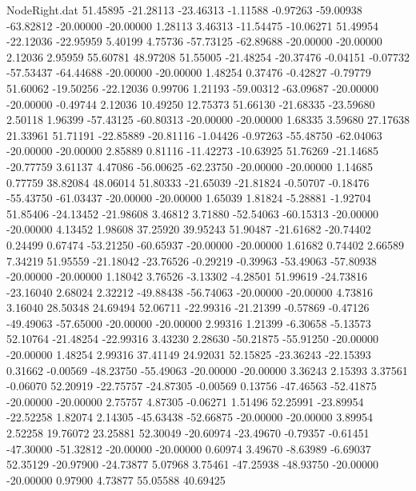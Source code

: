 \begin{filecontents}{NodeRight.dat}
  51.45895  -21.28113  -23.46313    -1.11588   -0.97263  -59.00938  -63.82812  -20.00000  -20.00000    1.28113    3.46313  -11.54475  -10.06271
  51.49954  -22.12036  -22.95959     5.40199    4.75736  -57.73125  -62.89688  -20.00000  -20.00000    2.12036    2.95959   55.60781   48.97208
  51.55005  -21.48254  -20.37476    -0.04151   -0.07732  -57.53437  -64.44688  -20.00000  -20.00000    1.48254    0.37476   -0.42827   -0.79779
  51.60062  -19.50256  -22.12036     0.99706    1.21193  -59.00312  -63.09687  -20.00000  -20.00000   -0.49744    2.12036   10.49250   12.75373
  51.66130  -21.68335  -23.59680     2.50118    1.96399  -57.43125  -60.80313  -20.00000  -20.00000    1.68335    3.59680   27.17638   21.33961
  51.71191  -22.85889  -20.81116    -1.04426   -0.97263  -55.48750  -62.04063  -20.00000  -20.00000    2.85889    0.81116  -11.42273  -10.63925
  51.76269  -21.14685  -20.77759     3.61137    4.47086  -56.00625  -62.23750  -20.00000  -20.00000    1.14685    0.77759   38.82084   48.06014
  51.80333  -21.65039  -21.81824    -0.50707   -0.18476  -55.43750  -61.03437  -20.00000  -20.00000    1.65039    1.81824   -5.28881   -1.92704
  51.85406  -24.13452  -21.98608     3.46812    3.71880  -52.54063  -60.15313  -20.00000  -20.00000    4.13452    1.98608   37.25920   39.95243
  51.90487  -21.61682  -20.74402     0.24499    0.67474  -53.21250  -60.65937  -20.00000  -20.00000    1.61682    0.74402    2.66589    7.34219
  51.95559  -21.18042  -23.76526    -0.29219   -0.39963  -53.49063  -57.80938  -20.00000  -20.00000    1.18042    3.76526   -3.13302   -4.28501
  51.99619  -24.73816  -23.16040     2.68024    2.32212  -49.88438  -56.74063  -20.00000  -20.00000    4.73816    3.16040   28.50348   24.69494
  52.06711  -22.99316  -21.21399    -0.57869   -0.47126  -49.49063  -57.65000  -20.00000  -20.00000    2.99316    1.21399   -6.30658   -5.13573
  52.10764  -21.48254  -22.99316     3.43230    2.28630  -50.21875  -55.91250  -20.00000  -20.00000    1.48254    2.99316   37.41149   24.92031
  52.15825  -23.36243  -22.15393     0.31662   -0.00569  -48.23750  -55.49063  -20.00000  -20.00000    3.36243    2.15393    3.37561   -0.06070
  52.20919  -22.75757  -24.87305    -0.00569    0.13756  -47.46563  -52.41875  -20.00000  -20.00000    2.75757    4.87305   -0.06271    1.51496
  52.25991  -23.89954  -22.52258     1.82074    2.14305  -45.63438  -52.66875  -20.00000  -20.00000    3.89954    2.52258   19.76072   23.25881
  52.30049  -20.60974  -23.49670    -0.79357   -0.61451  -47.30000  -51.32812  -20.00000  -20.00000    0.60974    3.49670   -8.63989   -6.69037
  52.35129  -20.97900  -24.73877     5.07968    3.75461  -47.25938  -48.93750  -20.00000  -20.00000    0.97900    4.73877   55.05588   40.69425

\end{filecontents}
